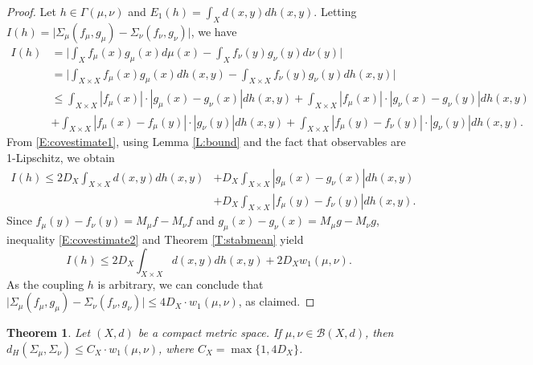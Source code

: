 \documentclass[11pt]{article}
\newtheorem{theorem}{Theorem}[section]
\theoremstyle{definition}
\newcommand{\borel}{\ensuremath{\mathcal{B}}}
\begin{document}
\begin{proof}
Let $h \in \Gamma(\mu, \nu)$ and $E_1(h) = \int_X d(x,y) dh (x,y)$. Letting $I (h) = \big|\Sigma_\mu (f_\mu,g_\mu) - \Sigma_\nu (f_\nu ,g_\nu ) \big|$, we have
\begin{equation} \label{E:covestimate1}
\begin{split}
I(h) &= \big|\int_X f_\mu (x) g_\mu (x) d\mu(x) - \int_X f_\nu(y) g_\nu (y) d\nu(y) \big| \\
&= \big|\int_{X\times X} f_\mu (x) g_\mu (x) dh(x,y) - \int_{X \times X} f_\nu(y) g_\nu (y) dh (x,y) \big| \\
&\leq \int_{X\times X} |f_\mu (x)| \cdot  |g_\mu (x)-g_\nu (x)| dh(x,y) 
+ \int_{X\times X} |f_\mu (x)| \cdot |g_\nu (x)-g_\nu (y)| dh(x,y) \\
&+ \int_{X\times X} |f_\mu (x)-f_\mu(y)| \cdot |g_\nu (y)| dh(x,y) 
+ \int_{X\times X} |f_\mu (y)-f_\nu(y)| \cdot |g_\nu (y)| dh(x,y).
\end{split}
\end{equation}
From \eqref{E:covestimate1}, using Lemma \ref{L:bound} and the fact that observables are 1-Lipschitz, we obtain
\begin{equation} \label{E:covestimate2}
\begin{split}
I(h) \leq 2 D_X \int_{X \times X} d(x,y) dh(x,y)
&+ D_X \int_{X\times X} |g_\mu (x)-g_\nu (x)| dh(x,y) \\
&+ D_X \int_{X\times X} |f_\mu (y)-f_\nu(y)| dh(x,y).
\end{split}
\end{equation}
Since $f_\mu(y) - f_\nu(y) = M_\mu f-M_\nu f$ and $g_\mu (x) - g_\nu (x) = M_\mu g - M_\nu g$, inequality \eqref{E:covestimate2} and Theorem \ref{T:stabmean} yield
\begin{equation}
I(h) \leq 2 D_X \int_{X \times X} d(x,y) dh(x,y) + 2 D_X w_1 (\mu,\nu).
\end{equation}
As the coupling $h$ is arbitrary, we can conclude that $\big|\Sigma_\mu (f_\mu , g_\mu ) - \Sigma_\nu (f_\nu , g_\nu )\big| \leq 4 D_X \cdot w_1 (\mu,\nu)$, as claimed.
\end{proof}

\begin{theorem} \label{T:stabcov}
Let $(X,d)$ be a compact metric space. If $\mu, \nu \in \borel (X,d)$, then $d_H(\Sigma_\mu, \Sigma_\nu) \leq C_X \cdot w_1 (\mu,\nu)$, where $C_X = \max\{1, 4D_X\}$.
\end{theorem}
\end{document}
